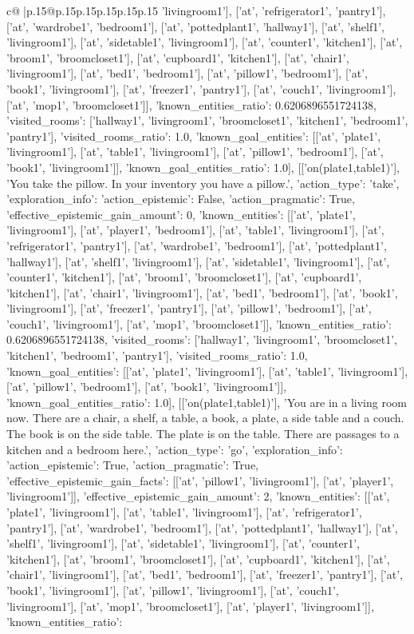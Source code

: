 \documentclass{article}
\begin{document}
{\begin{supertabular}{c@{$\;$}|p{.15\linewidth}@{}p{.15\linewidth}p{.15\linewidth}p{.15\linewidth}p{.15\linewidth}p{.15\linewidth}}
{{{'livingroom1'], ['at', 'refrigerator1', 'pantry1'], ['at', 'wardrobe1', 'bedroom1'], ['at', 'pottedplant1', 'hallway1'], ['at', 'shelf1', 'livingroom1'], ['at', 'sidetable1', 'livingroom1'], ['at', 'counter1', 'kitchen1'], ['at', 'broom1', 'broomcloset1'], ['at', 'cupboard1', 'kitchen1'], ['at', 'chair1', 'livingroom1'], ['at', 'bed1', 'bedroom1'], ['at', 'pillow1', 'bedroom1'], ['at', 'book1', 'livingroom1'], ['at', 'freezer1', 'pantry1'], ['at', 'couch1', 'livingroom1'], ['at', 'mop1', 'broomcloset1']], 'known_entities_ratio': 0.6206896551724138, 'visited_rooms': ['hallway1', 'livingroom1', 'broomcloset1', 'kitchen1', 'bedroom1', 'pantry1'], 'visited_rooms_ratio': 1.0, 'known_goal_entities': [['at', 'plate1', 'livingroom1'], ['at', 'table1', 'livingroom1'], ['at', 'pillow1', 'bedroom1'], ['at', 'book1', 'livingroom1']], 'known_goal_entities_ratio': 1.0}}], [['on(plate1,table1)'], 'You take the pillow. In your inventory you have a pillow.', {'action_type': 'take', 'exploration_info': {'action_epistemic': False, 'action_pragmatic': True, 'effective_epistemic_gain_amount': 0, 'known_entities': [['at', 'plate1', 'livingroom1'], ['at', 'player1', 'bedroom1'], ['at', 'table1', 'livingroom1'], ['at', 'refrigerator1', 'pantry1'], ['at', 'wardrobe1', 'bedroom1'], ['at', 'pottedplant1', 'hallway1'], ['at', 'shelf1', 'livingroom1'], ['at', 'sidetable1', 'livingroom1'], ['at', 'counter1', 'kitchen1'], ['at', 'broom1', 'broomcloset1'], ['at', 'cupboard1', 'kitchen1'], ['at', 'chair1', 'livingroom1'], ['at', 'bed1', 'bedroom1'], ['at', 'book1', 'livingroom1'], ['at', 'freezer1', 'pantry1'], ['at', 'pillow1', 'bedroom1'], ['at', 'couch1', 'livingroom1'], ['at', 'mop1', 'broomcloset1']], 'known_entities_ratio': 0.6206896551724138, 'visited_rooms': ['hallway1', 'livingroom1', 'broomcloset1', 'kitchen1', 'bedroom1', 'pantry1'], 'visited_rooms_ratio': 1.0, 'known_goal_entities': [['at', 'plate1', 'livingroom1'], ['at', 'table1', 'livingroom1'], ['at', 'pillow1', 'bedroom1'], ['at', 'book1', 'livingroom1']], 'known_goal_entities_ratio': 1.0}}], [['on(plate1,table1)'], 'You are in a living room now. There are a chair, a shelf, a table, a book, a plate, a side table and a couch. The book is on the side table. The plate is on the table. There are passages to a kitchen and a bedroom here.', {'action_type': 'go', 'exploration_info': {'action_epistemic': True, 'action_pragmatic': True, 'effective_epistemic_gain_facts': [['at', 'pillow1', 'livingroom1'], ['at', 'player1', 'livingroom1']], 'effective_epistemic_gain_amount': 2, 'known_entities': [['at', 'plate1', 'livingroom1'], ['at', 'table1', 'livingroom1'], ['at', 'refrigerator1', 'pantry1'], ['at', 'wardrobe1', 'bedroom1'], ['at', 'pottedplant1', 'hallway1'], ['at', 'shelf1', 'livingroom1'], ['at', 'sidetable1', 'livingroom1'], ['at', 'counter1', 'kitchen1'], ['at', 'broom1', 'broomcloset1'], ['at', 'cupboard1', 'kitchen1'], ['at', 'chair1', 'livingroom1'], ['at', 'bed1', 'bedroom1'], ['at', 'freezer1', 'pantry1'], ['at', 'book1', 'livingroom1'], ['at', 'pillow1', 'livingroom1'], ['at', 'couch1', 'livingroom1'], ['at', 'mop1', 'broomcloset1'], ['at', 'player1', 'livingroom1']], 'known_entities_ratio': }}}
\end{supertabular}}
\end{document}
